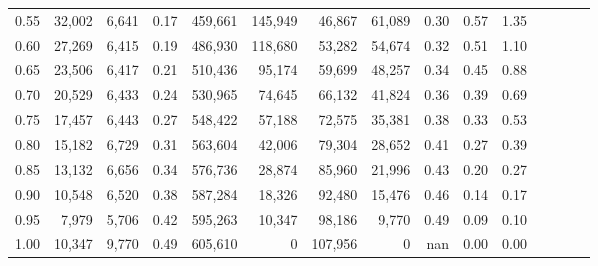 \begin{tabular}{rrrcrrrrrrrrrrr}
0.55 &  32,002 &  6,641 &                                       0.17 &  459,661 &  145,949 &   46,867 &   61,089 &  0.30 &  0.57 &                         1.35 \\
0.60 &  27,269 &  6,415 &                                       0.19 &  486,930 &  118,680 &   53,282 &   54,674 &  0.32 &  0.51 &                         1.10 \\
0.65 &  23,506 &  6,417 &                                       0.21 &  510,436 &   95,174 &   59,699 &   48,257 &  0.34 &  0.45 &                         0.88 \\
0.70 &  20,529 &  6,433 &                                       0.24 &  530,965 &   74,645 &   66,132 &   41,824 &  0.36 &  0.39 &                         0.69 \\
0.75 &  17,457 &  6,443 &                                       0.27 &  548,422 &   57,188 &   72,575 &   35,381 &  0.38 &  0.33 &                         0.53 \\
0.80 &  15,182 &  6,729 &                                       0.31 &  563,604 &   42,006 &   79,304 &   28,652 &  0.41 &  0.27 &                         0.39 \\
0.85 &  13,132 &  6,656 &                                       0.34 &  576,736 &   28,874 &   85,960 &   21,996 &  0.43 &  0.20 &                         0.27 \\
0.90 &  10,548 &  6,520 &                                       0.38 &  587,284 &   18,326 &   92,480 &   15,476 &  0.46 &  0.14 &                         0.17 \\
0.95 &   7,979 &  5,706 &                                       0.42 &  595,263 &   10,347 &   98,186 &    9,770 &  0.49 &  0.09 &                         0.10 \\
1.00 &  10,347 &  9,770 &                                       0.49 &  605,610 &        0 &  107,956 &        0 &   nan &  0.00 &                         0.00 \\
\bottomrule
\end{tabular}

